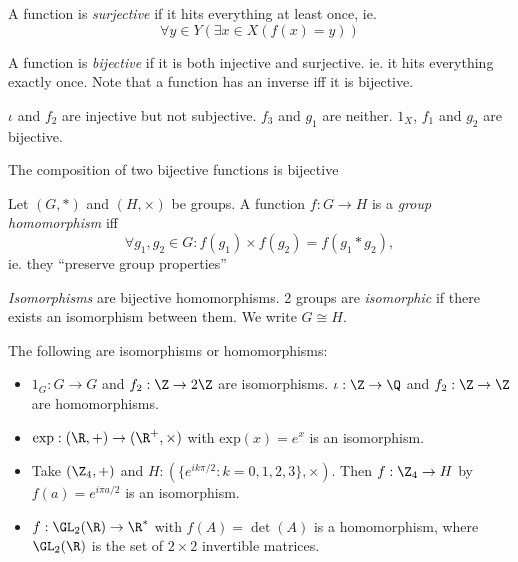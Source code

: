 \documentclass[a4paper]{article}
\begin{document}
  \begin{defi}
    A function is \emph{surjective} if it hits everything at least once, ie. 
    \[
      \forall y\in Y(\exists x\in X(f(x) = y))
    \]
  \end{defi}

  \begin{defi}
    A function is \emph{bijective} if it is both injective and surjective. ie. it hits everything exactly once. Note that a function has an inverse iff it is bijective.
  \end{defi}

  \begin{eg}
    $\iota$ and $f_2$ are injective but not subjective. $f_3$ and $g_1$ are neither. $1_X$, $f_1$ and $g_2$ are bijective.
  \end{eg}

  \begin{lemma}
    The composition of two bijective functions is bijective
  \end{lemma}

  \begin{defi}
    Let $(G, *)$ and $(H, \times)$ be groups. A function $f:G\rightarrow H$ is a \emph{group homomorphism} iff
    \[
      \forall g_1, g_2 \in G: f(g_1)\times f(g_2) = f(g_1 * g_2),
    \]
    ie. they ``preserve group properties''
  \end{defi}

  \begin{defi}
    \emph{Isomorphisms} are bijective homomorphisms. 2 groups are \emph{isomorphic} if there exists an isomorphism between them. We write $G\cong H$.
  \end{defi}

  \begin{eg}
    The following are isomorphisms or homomorphisms:
    \begin{itemize}
      \item $1_G: G \rightarrow G$ and $f_2: \Z \rightarrow 2\Z$  are isomorphisms. $\iota: \Z\rightarrow\Q$ and $f_2:\Z\rightarrow\Z$ are homomorphisms.
      \item $\mathrm{exp}: (\R, +) \rightarrow (\R^+, \times)$ with $\mathrm{exp}(x) = e^x$ is an isomorphism.
      \item Take $(\Z_4, +)$ and $H: (\{e^{ik\pi/2}:k=0, 1 ,2, 3\}, \times)$. Then $f: \Z_4 \rightarrow H$  by $f(a) = e^{i\pi a/2}$ is an isomorphism.
      \item $f: \GL_2(\R) \rightarrow \R^*$ with $f(A) = \det(A)$ is a homomorphism, where $\GL_2(\R)$ is the set of $2\times 2$ invertible matrices.
    \end{itemize}
  \end{eg}
\end{document}
